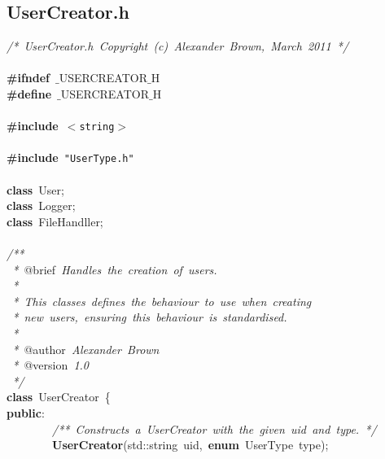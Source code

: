 \clearpage
\normalsize
\rmfamily
\subsection{UserCreator.h}
\scriptsize
\sffamily
\noindent
\mbox{}\textit{/*\ UserCreator.h\ Copyright\ (c)\ Alexander\ Brown,\ March\ 2011\ */} \\
\mbox{} \\
\mbox{}\textbf{\#ifndef}\ $\_$USERCREATOR$\_$H \\
\mbox{}\textbf{\#define}\ $\_$USERCREATOR$\_$H \\
\mbox{} \\
\mbox{}\textbf{\#include}\ \texttt{$<$string$>$} \\
\mbox{} \\
\mbox{}\textbf{\#include}\ \texttt{"{}UserType.h"{}} \\
\mbox{} \\
\mbox{}\textbf{class}\ User; \\
\mbox{}\textbf{class}\ Logger; \\
\mbox{}\textbf{class}\ FileHandller; \\
\mbox{} \\
\mbox{}\textit{/**} \\
\mbox{}\textit{\ *\ }@brief\textit{\ Handles\ the\ creation\ of\ users.} \\
\mbox{}\textit{\ *\ } \\
\mbox{}\textit{\ *\ This\ classes\ defines\ the\ behaviour\ to\ use\ when\ creating} \\
\mbox{}\textit{\ *\ new\ users,\ ensuring\ this\ behaviour\ is\ standardised.} \\
\mbox{}\textit{\ *} \\
\mbox{}\textit{\ *\ }@author\textit{\ Alexander\ Brown} \\
\mbox{}\textit{\ *\ }@version\textit{\ 1.0} \\
\mbox{}\textit{\ */} \\
\mbox{}\textbf{class}\ UserCreator\ \{ \\
\mbox{}\textbf{public}: \\
\mbox{}\ \ \ \ \ \ \ \ \textit{/**\ Constructs\ a\ UserCreator\ with\ the\ given\ uid\ and\ type.\ */} \\
\mbox{}\ \ \ \ \ \ \ \ \textbf{UserCreator}(std::string\ uid,\ \textbf{enum}\ UserType\ type); \\
\mbox{} \\
